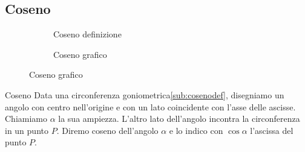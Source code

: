 \subsection{Coseno}
\label{sec:cosenogonio}
\begin{figure}
	\begin{subfigure}[b]{.5\linewidth}
		\centering
		
		\caption{Coseno definizione}\label{sub:cosenodef}
	\end{subfigure}%
	\begin{subfigure}[b]{.5\linewidth}
	\centering
		
		\caption{Coseno grafico}\label{sub:cosenograf}
	\end{subfigure}
	\label{ztzcos}
\end{figure}
\begin{definizionet}{Coseno}{}
Data una circonferenza goniometrica\nobs\vref{sub:cosenodef}, disegniamo un angolo con centro nell'origine e con un lato coincidente con l'asse delle ascisse.  Chiamiamo  $\alpha$ la sua ampiezza. L'altro lato dell'angolo incontra la circonferenza in un punto $P$.  Diremo  coseno dell'angolo $\alpha$ e lo indico con $\cos\alpha$ l'ascissa del punto $P$.
\end{definizionet}
